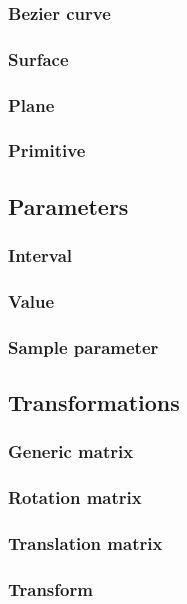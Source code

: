 \documentclass{article}
\begin{document}
\subsubsection{Bezier curve}\label{sss:bez_curve}
\subsubsection{Surface}\label{sss:surface}
\subsubsection{Plane}\label{sss:plane}
\subsubsection{Primitive}\label{sss:primitive}
\subsection{Parameters}\label{ss:parameters}
\subsubsection{Interval}\label{sss:interval}
\subsubsection{Value}\label{sss:value}
\subsubsection{Sample parameter}\label{sss:samp_par}
\subsection{Transformations}\label{ss:transformations}
\subsubsection{Generic matrix}\label{sss:gen_mat}
\subsubsection{Rotation matrix}\label{sss:rot_mat}
\subsubsection{Translation matrix}\label{sss:transl_mat}
\subsubsection{Transform}\label{sss:trans}
\end{document}
